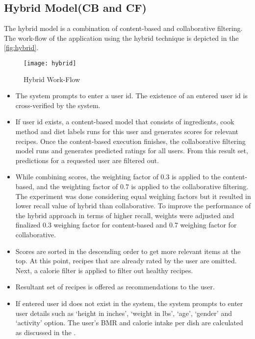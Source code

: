\subsection{Hybrid Model(CB and CF)}
\label{sec:hybrid_impl}
The hybrid model is a combination of content-based and collaborative filtering. The work-flow of the application using the hybrid technique is depicted in the \autoref{fig:hybrid}.
\begin{singlespace}
\begin{figure}[H]
\centering
\texttt{[image: hybrid]}
\caption{Hybrid Work-Flow }
\label{fig:hybrid}
\end{figure}
\end{singlespace}
\begin{itemize}
\item The system prompts to enter a user id. The existence of an entered user id is cross-verified by the system.
\item If user id exists, a content-based model that consists of ingredients, cook method and diet labels runs for this user and generates scores for relevant recipes. Once the content-based execution finishes, the collaborative filtering model runs and generates predicted ratings for all users. From this result set, predictions for a requested user are filtered out.
\item While combining scores, the weighting factor of 0.3 is applied to the content-based, and the weighting factor of 0.7 is applied to the collaborative filtering. The experiment was done considering equal weighing factors but it resulted in lower recall value of hybrid than collaborative. To improve the performance of the hybrid approach in terms of higher recall, weights were adjusted and finalized 0.3 weighing factor for content-based and 0.7 weighing factor for collaborative.
\item Scores are sorted in the descending order to get more relevant items at the top. At this point, recipes that are already rated by the user are omitted. Next, a calorie filter is applied to filter out healthy recipes.
\item Resultant set of recipes is offered as recommendations to the user.
\item If entered user id does not exist in the system, the system prompts to enter user details such as \lq{}height in inches\rq{}, \lq{}weight in lbs\rq{}, \lq{}age\rq{}, \lq{}gender\rq{} and \lq{}activity\rq{} option. The user's BMR and calorie intake per dish are calculated as discussed in the .

\end{itemize}
